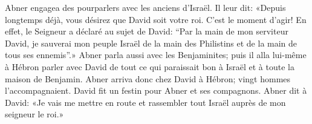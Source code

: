 Abner engagea des pourparlers avec les anciens d’Israël.
Il leur dit: «Depuis longtemps déjà, vous désirez que David soit votre roi.
	C’est le moment d’agir!
En effet, le Seigneur a déclaré au sujet de David:
	“Par la main de mon serviteur David,
	je sauverai mon peuple Israël de la main des Philistins
		et de la main de tous ses ennemis”.»
Abner parla aussi avec les Benjaminites;
	puis il alla lui-même à Hébron parler avec David
	de tout ce qui paraissait bon à Israël et à toute la maison de Benjamin.
Abner arriva donc chez David à Hébron; vingt hommes l’accompagnaient.
David fit un festin pour Abner et ses compagnons.
Abner dit à David:
	«Je vais me mettre en route et rassembler tout Israël auprès de mon seigneur le roi.»
